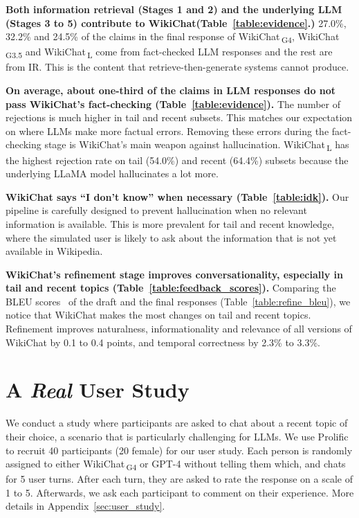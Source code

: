\documentclass[11pt]{article}
\newcommand{\system}[0]{WikiChat\xspace}
\newcommand{\systemgt}[0]{WikiChat$\,$\textsubscript{G3.5}\xspace}
\newcommand{\systemgf}[0]{WikiChat$\,$\textsubscript{G4}\xspace}
\newcommand{\systeml}[0]{WikiChat$\,$\textsubscript{L}\xspace}
\begin{document}
{\bf Both information retrieval (Stages 1 and 2) and the underlying LLM (Stages 3 to 5) contribute to \system (Table~\ref{table:evidence}.)}
27.0\%, 32.2\% and 24.5\% of the claims in the final response of \systemgf, \systemgt and \systeml come from fact-checked LLM responses 
and the rest are from IR. This is the content that retrieve-then-generate systems cannot produce. 

{\bf On average, about one-third of the claims in LLM responses do not pass \system's fact-checking (Table~\ref{table:evidence}).} The number of rejections is much higher in tail and recent subsets. This matches our expectation on where LLMs make more factual errors. Removing these errors during the fact-checking stage is \system's main weapon against hallucination.
\systeml has the highest rejection rate on tail (54.0\%) and recent (64.4\%) subsets because the underlying LLaMA model hallucinates a lot more.

{\bf \system says ``I don't know'' when necessary (Table~\ref{table:idk}).} 
Our pipeline is carefully designed to prevent hallucination when no relevant information is available.
This is more prevalent for tail and recent knowledge, where the simulated user is likely to ask about the information that is not yet available in Wikipedia.

{\bf \system's refinement stage improves conversationality, especially in tail and recent topics (Table~\ref{table:feedback_scores}).}
Comparing the BLEU scores~\cite{papineni-etal-2002-bleu} of the draft and the final responses (Table~\ref{table:refine_bleu}), we notice that 
\system makes the most changes on tail and recent topics. Refinement improves naturalness, informationality and relevance of all versions of \system by 0.1 to 0.4 points, and temporal correctness by 2.3\% to 3.3\%.


\section{A {\em Real} User Study}
We conduct a study where participants are asked to chat about a recent topic of their choice, a scenario that is particularly challenging for LLMs. We use Prolific~\cite{prolific} to recruit 40 participants (20 female) for our user study. Each person is randomly assigned to either \systemgf or GPT-4 without telling them which, and chats for 5 user turns. After each turn, they are asked to rate the response on a scale of 1 to 5. Afterwards, we ask each participant to comment on their experience.
More details in Appendix~\ref{sec:user_study}.
\end{document}
